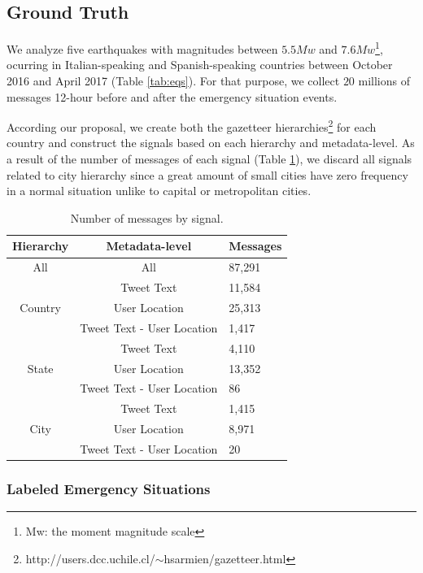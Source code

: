 \documentclass[sigconf]{acmart}
\begin{document}
\subsection{Ground Truth}

We analyze five earthquakes with magnitudes between $5.5Mw$ and $7.6Mw$\footnote{Mw: the moment magnitude scale}, ocurring in Italian-speaking and Spanish-speaking countries between October 2016 and April 2017 (Table \ref{tab:eqs}). For that purpose, we collect $20$ millions of messages 12-hour before and after the emergency situation events. 

According our proposal, we create both the gazetteer hierarchies\footnote{http://users.dcc.uchile.cl/$\sim$hsarmien/gazetteer.html} for each country and construct the signals based on each hierarchy and metadata-level. As a result of the number of messages of each signal (Table \ref{tab:message_signal}), we discard all signals related to city hierarchy since a great amount of small cities have zero frequency in a normal situation unlike to capital or metropolitan cities.




\begin{table}
	\caption{Number of messages by signal.}
	\label{tab:message_signal}
	\begin{tabular}{ccl}
		\toprule
		Hierarchy&Metadata-level&Messages\\
		\midrule
		All & All & 87,291 \\
		\midrule
	    \multirow{3}{*}{Country} & Tweet Text & 11,584 \\
	    & User Location & 25,313\\
	    & Tweet Text - User Location & 1,417\\	
		\bottomrule
		\multirow{3}{*}{State} & Tweet Text & 4,110 \\
		& User Location & 13,352\\
		& Tweet Text - User Location & 86\\
		\midrule
		\multirow{3}{*}{City} & Tweet Text & 1,415 \\
		& User Location & 8,971\\
		& Tweet Text - User Location & 20\\
		\bottomrule
	\end{tabular}
\end{table} 

\subsubsection{Labeled Emergency Situations}
\end{document}
